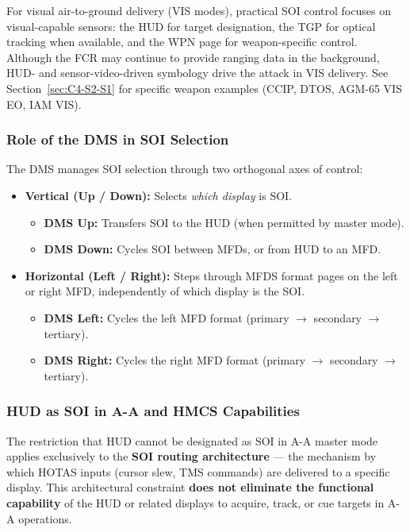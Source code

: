 \documentclass[11pt,a4paper]{article}
\begin{document}
For visual air-to-ground delivery (VIS modes), practical SOI control focuses on visual-capable sensors: the HUD for target designation, the TGP for optical tracking when available, and the WPN page for weapon-specific control. Although the FCR may continue to provide ranging data in the background, HUD- and sensor-video-driven symbology drive the attack in VIS delivery. See Section~\ref{sec:C4-S2-S1} for specific weapon examples (CCIP, DTOS, AGM-65 VIS EO, IAM VIS).

\subsubsection{Role of the DMS in SOI Selection}

\label{sec:C4-S1-S2}

The DMS manages SOI selection through two orthogonal axes of control:

\begin{itemize}
    \item \textbf{Vertical (Up / Down):} Selects \textit{which display} is SOI.
        \begin{itemize}
            \item \textbf{DMS Up:} Transfers SOI to the HUD (when permitted by master mode).
            \item \textbf{DMS Down:} Cycles SOI between MFDs, or from HUD to an MFD.
        \end{itemize}
    \item \textbf{Horizontal (Left / Right):} Steps through MFDS format pages on the left or right MFD, independently of which display is the SOI.
        \begin{itemize}
            \item \textbf{DMS Left:} Cycles the left MFD format (primary $\to$ secondary $\to$ tertiary).
            \item \textbf{DMS Right:} Cycles the right MFD format (primary $\to$ secondary $\to$ tertiary).
        \end{itemize}
\end{itemize}

\subsubsection{HUD as SOI in A-A and HMCS Capabilities}

\label{sec:C4-S1-S3}

The restriction that HUD cannot be designated as SOI in A-A master mode applies exclusively to the \textbf{SOI routing architecture} — the mechanism by which HOTAS inputs (cursor slew, TMS commands) are delivered to a specific display. This architectural constraint \textbf{does not eliminate the functional capability} of the HUD or related displays to acquire, track, or cue targets in A-A operations.
\end{document}
